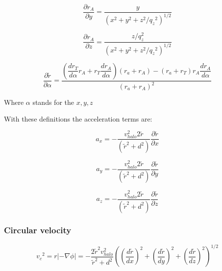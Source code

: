 \begin{equation}
\dfrac{\partial r_A}{\partial y} = \dfrac{y}{(x^2 + y^2 + z^2/{q_z}^2)^{1/2}}
\end{equation}

\begin{equation}
\dfrac{\partial r_A}{\partial z} = \dfrac{z/q_z^2}{(x^2 + y^2 + z^2/{q_z}^2)^{1/2}}
\end{equation}

\begin{equation}
\dfrac{\partial \tilde{r}}{\partial \alpha} = \dfrac{\left( \dfrac{dr_T}{d\alpha} r_A + r_T \dfrac{dr_A}{d\alpha}\right) (r_a + r_A) - (r_a + r_T)r_A \dfrac{dr_A}{d\alpha} }{(r_a + r_A)^2}
\end{equation}

Where $\alpha$ stands for the $x, y, z$

With these definitions the acceleration terms are:

\begin{equation}
a_x = - \dfrac{v_{halo}^2 2 \tilde{r}}{(\tilde{r}^2 + d^2)} \dfrac{\partial \tilde{r}}{\partial x}
\end{equation}

\begin{equation}
a_y = - \dfrac{v_{halo}^2 2 \tilde{r}}{(\tilde{r}^2 + d^2)} \dfrac{\partial \tilde{r}}{\partial y}
\end{equation}

\begin{equation}
a_z = - \dfrac{v_{halo}^2 2 \tilde{r}}{(\tilde{r}^2 + d^2)} \dfrac{\partial \tilde{r}}{\partial z}
\end{equation}

\subsubsection{Circular velocity}

\begin{equation}
{v_c}^2 = r|-\nabla \phi|  = - \dfrac{2 \tilde{r}^2 v_{halo}^2}{\tilde{r}^2  + d^2} \left( \left( \dfrac{d\tilde{r} }{dx}\right)^2 + \left( \dfrac{d\tilde{r} }{dy}\right)^2 + \left( \dfrac{d\tilde{r} }{dz}\right)^2  \right)^{1/2} 
\end{equation}




